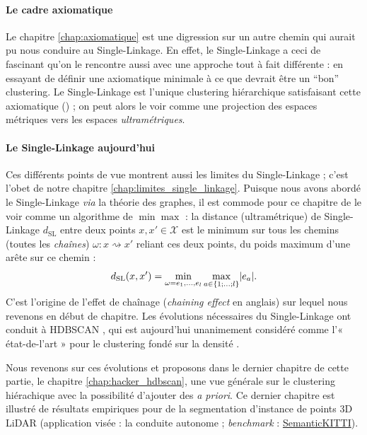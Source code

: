 \documentclass{these-ISSS} %
\begin{document}
\paragraph{Le cadre axiomatique} 
Le chapitre \ref{chap:axiomatique} est une digression sur un autre chemin qui aurait pu nous conduire au Single-Linkage.
En effet, le Single-Linkage a ceci de fascinant qu'on le rencontre aussi avec une approche tout à fait différente : en essayant de définir une axiomatique minimale à ce que devrait être un ``bon'' clustering.
Le Single-Linkage est l'unique clustering hiérarchique satisfaisant cette axiomatique () ; on peut alors le voir comme une projection des espaces métriques vers les espaces \emph{ultramétriques}.


\paragraph{Le Single-Linkage aujourd'hui}
Ces différents points de vue montrent aussi les limites du Single-Linkage ; c'est l'obet de notre chapitre \ref{chap:limites_single_linkage}. Puisque nous avons abordé le Single-Linkage \emph{via} la théorie des graphes, il est commode pour ce chapitre de le voir comme un algorithme de $\min \max$ : la distance (ultramétrique) de Single-Linkage $d_{\mathrm{SL}}$ entre deux points $x,x' \in \mathcal X$ est le minimum sur tous les chemins (toutes les \emph{chaînes}) $\omega : x \rightsquigarrow x'$  reliant ces deux points, du poids maximum d'une arête sur ce chemin :
\[
d_{\mathrm{SL}}(x,x') = \min_{\omega = e_1,\ldots , e_l} \max_{a \in \{ 1 ; \ldots ; l\}} \lvert e_a \rvert.
\]
C'est l'origine de l'effet de chaînage (\emph{chaining effect} en anglais) sur lequel nous revenons en début de chapitre.
Les évolutions nécessaires du Single-Linkage ont conduit à HDBSCAN \cite{HDBSCAN, HDBSCAN2017}, qui est aujourd'hui unanimement considéré comme l'« état-de-l'art » pour le clustering fondé sur la densité \cite{HDBSCAN2025SOTA, FLASC2025}. 

Nous revenons sur ces évolutions et proposons dans le dernier chapitre de cette partie, le chapitre \ref{chap:hacker_hdbscan}, une vue générale sur le clustering hiérachique avec la possibilité d'ajouter des \emph{a priori}. Ce dernier chapitre est illustré de résultats empiriques pour de la segmentation d'instance de points 3D LiDAR (application visée : la conduite autonome ; \emph{benchmark} : \href{https://semantic-kitti.org/}{SemanticKITTI}).

\end{document}
